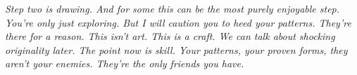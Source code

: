 \clearpage
\thispagestyle{empty}

\vspace*{\fill}
\begin{adjustwidth}{1in}{1in}
  \textit{Step two is drawing. And for some this can be the most purely
          enjoyable step. You're only just exploring. But I will caution you to
          heed your patterns. They're there for a reason. This isn't art. This
          is a craft. We can talk about shocking originality later. The point
          now is skill. Your patterns, your proven forms, they aren't your
          enemies. They're the only friends you have.}
\end{adjustwidth}
\vspace*{\fill}

\restoregeometry
\doublespace
